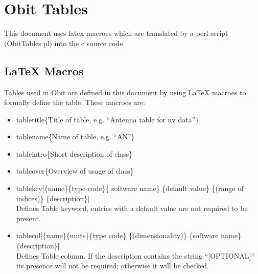 \documentclass[11pt]{article}
\begin{document}
\section{Obit Tables}
This document uses latex macroes which are translated by a perl
script (ObitTables.pl) into the c source code.

\subsection{LaTeX Macros}
Tables used in Obit are defined in this document by using LaTeX
macroes to formally define the table.
These macroes are:
\begin{itemize}
\item tabletitle\{Title of table, e.g. ``Antenna table for uv data''\}
\item tablename\{Name of table, e.g. ``AN''\}
\item tableintro\{Short description of class\}
\item tableover\{Overview of usage of class\}
\item tablekey[\{name\}\{type code\}\{ software name\} \{default value\}
\{(range of indices)\} \{description\}]\\
Defines Table keyword, entries with a default value are not required to
be present.
\item tablecol[\{name\}\{units\}\{type code\} \{(dimensionality)\} \{software
name\} \{description\}]\\
Defines Table column.
If the description contains the string ``[OPTIONAL]'' its presence
will not be required; otherwise it will be checked.
\end{itemize}
\end{document}
